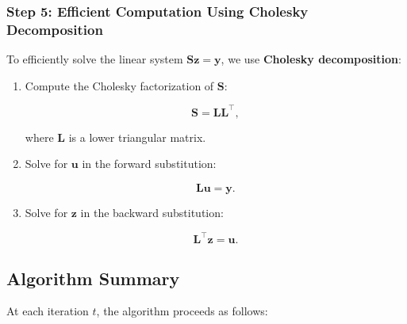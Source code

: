 \subsubsection{Step 5: Efficient Computation Using Cholesky Decomposition}

To efficiently solve the linear system $\mathbf{S} \boldsymbol{z} = \boldsymbol{y}$, we use \textbf{Cholesky decomposition}:

\begin{enumerate}
    \item Compute the Cholesky factorization of $\mathbf{S}$:

    \[
    \mathbf{S} = \mathbf{L} \mathbf{L}^\top,
    \]

    where $\mathbf{L}$ is a lower triangular matrix.

    \item Solve for $\boldsymbol{u}$ in the forward substitution:

    \[
    \mathbf{L} \boldsymbol{u} = \boldsymbol{y}.
    \]

    \item Solve for $\boldsymbol{z}$ in the backward substitution:

    \[
    \mathbf{L}^\top \boldsymbol{z} = \boldsymbol{u}.
    \]
\end{enumerate}

\subsection{Algorithm Summary}

At each iteration $t$, the algorithm proceeds as follows:

